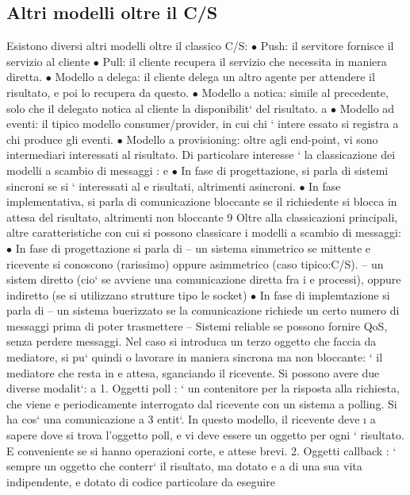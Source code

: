 \documentclass[a4paper,12pt]{article}
\begin{document}
\subsection{Altri modelli oltre il C/S}
Esistono diversi altri modelli oltre il classico C/S:
$\bullet$ Push: il servitore fornisce il servizio al cliente
$\bullet$ Pull: il cliente recupera il servizio che necessita in maniera diretta.
$\bullet$ Modello a delega: il cliente delega un altro agente per attendere il risultato,
e poi lo recupera da questo.
$\bullet$ Modello a notica: simile al precedente, solo che il delegato notica al
cliente la disponibilit` del risultato.
a
$\bullet$ Modello ad eventi: il tipico modello consumer/provider, in cui chi ` intere
essato si registra a chi produce gli eventi.
$\bullet$ Modello a provisioning: oltre agli end-point, vi sono intermediari interessati al risultato.
Di particolare interesse ` la classicazione dei modelli a scambio di messaggi :
e
$\bullet$ In fase di progettazione, si parla di sistemi sincroni se si ` interessati al
e
risultati, altrimenti asincroni.
$\bullet$ In fase implementativa, si parla di comunicazione bloccante se il richiedente
si blocca in attesa del risultato, altrimenti non bloccante
9
\newpage
Oltre alla classicazioni principali, altre caratteristiche con cui si possono classicare i modelli a scambio di
messaggi:
$\bullet$ In fase di progettazione si parla di
-- un sistema simmetrico se mittente e ricevente si conoscono (rarissimo) oppure asimmetrico (caso tipico:C/S).
-- un sistem diretto (cio` se avviene una comunicazione diretta fra i
e
processi), oppure indiretto (se si utilizzano strutture tipo le socket)
$\bullet$ In fase di implemtazione si parla di
-- un sistema buerizzato se la comunicazione richiede un certo numero
di messaggi prima di poter trasmettere
-- Sistemi reliable se possono fornire QoS, senza perdere messaggi.
Nel caso si introduca un terzo oggetto che faccia da mediatore, si pu` quindi
o
lavorare in maniera sincrona ma non bloccante: ` il mediatore che resta in
e
attesa, sganciando il ricevente. Si possono avere due diverse modalit`:
a
1. Oggetti poll : ` un contenitore per la risposta alla richiesta, che viene
e
periodicamente interrogato dal ricevente con un sistema a polling. Si ha
cos` una comunicazione a 3 entit`. In questo modello, il ricevente deve
\i{}
a
sapere dove si trova l'oggetto poll, e vi deve essere un oggetto per ogni
`
risultato. E conveniente se si hanno operazioni corte, e attese brevi.
2. Oggetti callback : ` sempre un oggetto che conterr` il risultato, ma dotato
e
a
di una sua vita indipendente, e dotato di codice particolare da eseguire
\end{document}
